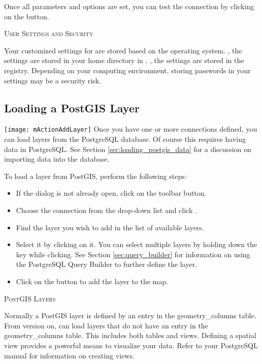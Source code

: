 Once all parameters and options are set, you can test the connection by
clicking on the  button.

\begin{Tip}\caption{\textsc{\qg User Settings and
Security}}
Your customized settings for \qg are stored based on the operating
system. \nix, the settings are stored in your home directory in
. \win, the settings are stored in the registry. Depending on
your computing environment, storing passwords in your \qg settings may be a
security risk.
\end{Tip}

\subsection{Loading a PostGIS Layer}

\texttt{[image: mActionAddLayer]} Once you have one or more
connections defined, you can load layers from the PostgreSQL database. Of
course this requires having data in PostgreSQL. See Section
\ref{sec:loading_postgis_data} for a discussion on importing data into the
database. 

To load a layer from PostGIS, perform the following steps:

\begin{itemize}[label=--]
\item If the  dialog is not already open, click on the
 toolbar button.
\item Choose the connection from the drop-down list and click .
\item Find the layer you wish to add in the list of available layers.
\item Select it by clicking on it. You can select multiple layers by holding
down the  key while clicking. See Section \ref{sec:query_builder} for
information on using the PostgreSQL Query Builder to further define the layer.
\item Click on the  button to add the layer to the map.
\end{itemize}

\begin{Tip}\caption{\textsc{PostGIS Layers}}
Normally a PostGIS layer is defined by an entry in the
geometry\_columns table. From version \OLD %
on, \qg can load layers that do not have
an entry in the geometry\_columns table. This includes both tables and views.
Defining a spatial view provides a powerful means to visualize your data. Refer
to your PostgreSQL manual for information on creating views.
\end{Tip}

